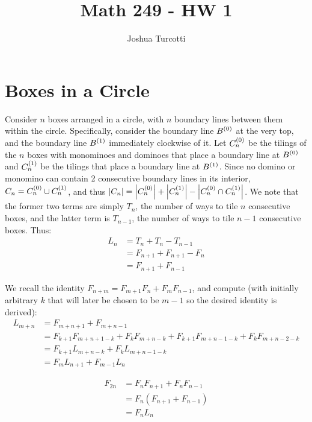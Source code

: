 \documentclass{article}
\title{Math 249 - HW 1}
\author{Joshua Turcotti}
\begin{document}
\maketitle
\section{Boxes in a Circle}


\begin{alphalist}
\item Consider $n$ boxes arranged in a circle, with $n$ boundary lines between them within the circle. Specifically, consider the boundary line $B^{(0)}$ at the very top, and the boundary line $B^{(1)}$ immediately clockwise of it. Let $C^{(0)}_n$ be the tilings of the $n$ boxes with monominoes and dominoes that place a boundary line at $B^{(0)}$ and $C^{(1)}_n$ be the tilings that place a boundary line at $B^{(1)}$. Since no domino or monomino can contain 2 consecutive boundary lines in its interior, $C_n = C^{(0)}_n \cup C^{(1)}_n$, and thus $\abs{C_n} = \abs{C^{(0)}_n} + \abs{C^{(1)}_n} - \abs{C^{(0)}_n \cap C^{(1)}_n}$. We note that the former two terms are simply $T_n$, the number of ways to tile $n$ consecutive boxes, and the latter term is $T_{n-1}$, the number of ways to tile $n-1$ consecutive boxes. Thus:
\begin{align*}
L_n &= T_n + T_n - T_{n-1}\\
&= F_{n+1} + F_{n+1} - F_n \\
&= F_{n+1} + F_{n-1}
\end{align*}
\item We recall the identity $F_{n+m} = F_{m+1}F_n + F_mF_{n-1}$, and compute (with initially arbitrary $k$ that will later be chosen to be $m-1$ so the desired identity is derived):
\begin{align*}
L_{m+n} &= F_{m+ n +1} + F_{m + n -1} \\
&= F_{k+1}F_{m + n + 1 -k} + F_kF_{m + n - k} + F_{k+1}F_{m + n - 1 -k} + F_kF_{m + n - 2 - k} \\
&= F_{k+1}L_{m + n - k} + F_kL_{m + n -1 - k} \\
&= F_{m}L_{n + 1} + F_{m-1}L_n
\end{align*}
\item \begin{align*}
F_{2n} &= F_nF_{n+1} + F_nF_{n-1} \\
&=F_n(F_{n+1} + F_{n-1}) \\
&= F_nL_n
\end{align*}
\end{alphalist}
\end{document}
